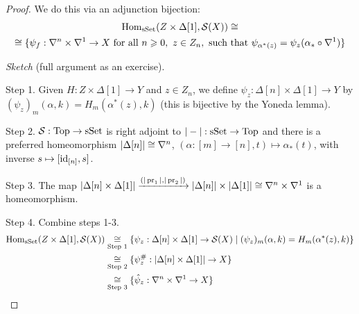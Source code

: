 \begin{proof}
We do this via an adjunction bijection:
\begin{multline*}
    \operatorname{Hom}_{\mathrm{sSet}}(Z\times\Delta[1],\mathcal{S}(X))\cong\\
    \cong\{\psi_f:\nabla^n\times\nabla^1\to X \text{ for all } n\geqslant0,\ z\in Z_n,\text{ such that } \psi_{\alpha^*(z)}=\psi_z(\alpha_*\circ\nabla^1)\}
\end{multline*}

\textit{Sketch} (full argument as an exercise).

Step 1. Given $H:Z\times\Delta[1]\to Y$ and $z\in Z_n$, we define $\psi_z:\Delta[n]\times\Delta[1]\to Y$ by $(\psi_z)_m(\alpha,k)=H_m(\alpha^*(z),k)$ (this is bijective by the Yoneda lemma).

Step 2. $\mathcal{S}:{\mathrm{Top}}\to{\mathrm{sSet}}$ is right adjoint to $|-|:{\mathrm{sSet}}\to{\mathrm{Top}}$ and there is a preferred homeomorphism $|\Delta[n]|\cong\nabla^n$, $(\alpha:[m]\to[n],t)\mapsto\alpha_*(t)$, with inverse $s\mapsto[\operatorname{id}_{[n]},s]$.

Step 3. The map $|\Delta[n]\times\Delta[1]|\xrightarrow{(|\operatorname{pr}_1|,|\operatorname{pr}_2|)}|\Delta[n]|\times|\Delta[1]|\cong\nabla^n\times\nabla^{1}$ is a homeomorphism.

Step 4. Combine steps 1-3.
\begin{align*}
    \operatorname{Hom}_{\mathrm{sSet}}(Z\times\Delta[1],\mathcal{S}(X))&\underset{\text{Step 1}}{\cong}\{\psi_z:\Delta[n]\times\Delta[1]\to\mathcal{S}(X)\mid(\psi_z)_m(\alpha,k)=H_m(\alpha^*(z),k)\} \\
    &\underset{\text{Step 2}}{\cong}\{\psi_z^\#:|\Delta[n]\times\Delta[1]|\to X\} \\
    &\underset{\text{Step 3}}{\cong}\{\hat\psi_z:\nabla^n\times\nabla^{1}\to X\}
\end{align*}\reversemarginpar{}

\end{proof}

